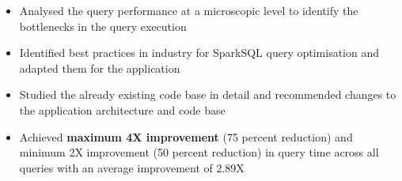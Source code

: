 \documentclass{article}
\begin{document}
\begin{itemize}[leftmargin=0.07cm]
\begin{itemize}[leftmargin=0.07cm]
\begin{itemize}
	\item Analysed the query performance at a microscopic level to identify the bottlenecks in the query execution
	\item Identified best practices in industry for SparkSQL query optimisation and adapted them for the application
	\item Studied the already existing code base in detail and recommended changes to the application architecture and code base
    \item Achieved \textbf{maximum 4X improvement} (75 percent reduction) and minimum 2X improvement (50 percent reduction) in query time across all queries with an average improvement of 2.89X
    \end{itemize}
\end{itemize}
\end{itemize}
\renewcommand{\labelitemi}{}
\renewcommand\labelitemii{$\circ$}
\renewcommand{\labelitemiii}{$\bullet$}
\end{document}
